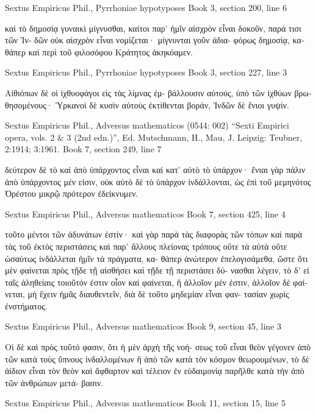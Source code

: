 \documentclass[12pt,letterpaper,twoside,final]{memoir}
\begin{document}
\begin{greek}
Sextus Empiricus Phil., Pyrrhoniae hypotyposes 
Book 3, section 200, line 6

                       καὶ τὸ δημοσίᾳ γυναικὶ μίγνυσθαι, 
καίτοι παρ' ἡμῖν αἰσχρὸν εἶναι δοκοῦν, παρά τισι τῶν Ἰν-
δῶν οὐκ αἰσχρὸν εἶναι νομίζεται· μίγνυνται γοῦν ἀδια-
φόρως δημοσίᾳ, καθάπερ καὶ περὶ τοῦ φιλοσόφου Κράτητος 
ἀκηκόαμεν. 



Sextus Empiricus Phil., Pyrrhoniae hypotyposes 
Book 3, section 227, line 3

           Αἰθιόπων δὲ οἱ ἰχθυοφάγοι εἰς τὰς λίμνας ἐμ-
βάλλουσιν αὐτούς, ὑπὸ τῶν ἰχθύων βρωθησομένους· 
Ὑρκανοὶ δὲ κυσὶν αὐτοὺς ἐκτίθενται βοράν, Ἰνδῶν δὲ 
ἔνιοι γυψίν. 



Sextus Empiricus Phil., Adversus mathematicos (0544: 002)
“Sexti Empirici opera, vols. 2 \& 3 (2nd edn.)”, Ed. Mutschmann, H., Mau, J.
Leipzig: Teubner, 2:1914; 3:1961.
Book 7, section 249, line 7

                                                      δεύτερον δὲ τὸ 
καὶ ἀπὸ ὑπάρχοντος εἶναι καὶ κατ' αὐτὸ τὸ ὑπάρχον· 
ἔνιαι γὰρ πάλιν ἀπὸ ὑπάρχοντος μέν εἰσιν, οὐκ αὐτὸ δὲ 
τὸ ὑπάρχον ἰνδάλλονται, ὡς ἐπὶ τοῦ μεμηνότος Ὀρέστου 
μικρῷ πρότερον ἐδείκνυμεν. 



Sextus Empiricus Phil., Adversus mathematicos 
Book 7, section 425, line 4

               τοῦτο μέντοι τῶν ἀδυνάτων ἐστίν· καὶ 
γὰρ παρὰ τὰς διαφορὰς τῶν τόπων καὶ παρὰ τὰς τοῦ 
ἐκτὸς περιστάσεις καὶ παρ' ἄλλους πλείονας τρόπους οὔτε 
τὰ αὐτὰ οὔτε ὡσαύτως ἰνδάλλεται ἡμῖν τὰ πράγματα, κα-
θάπερ ἀνώτερον ἐπελογισάμεθα, ὥστε ὅτι μὲν 
φαίνεται πρὸς τῇδε τῇ αἰσθήσει καὶ τῇδε τῇ περιστάσει δύ-
νασθαι λέγειν, τὸ δ' εἰ ταῖς ἀληθείαις τοιοῦτόν ἐστιν οἷον 
καὶ φαίνεται, ἢ ἀλλοῖον μέν ἐστιν, ἀλλοῖον δὲ φαίνεται, μὴ 
ἔχειν ἡμᾶς διαυθεντεῖν, διὰ δὲ τοῦτο μηδεμίαν εἶναι φαν-
τασίαν χωρὶς ἐνστήματος. 



Sextus Empiricus Phil., Adversus mathematicos 
Book 9, section 45, line 3

Οἱ δὲ καὶ πρὸς τοῦτό φασιν, ὅτι ἡ μὲν ἀρχὴ τῆς νοή-
σεως τοῦ εἶναι θεὸν γέγονεν ἀπὸ τῶν κατὰ τοὺς ὕπνους 
ἰνδαλλομένων ἢ ἀπὸ τῶν κατὰ τὸν κόσμον θεωρουμένων, 
τὸ δὲ ἀίδιον εἶναι τὸν θεὸν καὶ ἄφθαρτον καὶ τέλειον ἐν 
εὐδαιμονίᾳ παρῆλθε κατὰ τὴν ἀπὸ τῶν ἀνθρώπων μετά-
βασιν. 



Sextus Empiricus Phil., Adversus mathematicos 
Book 11, section 15, line 5


\end{greek}
\end{document}
